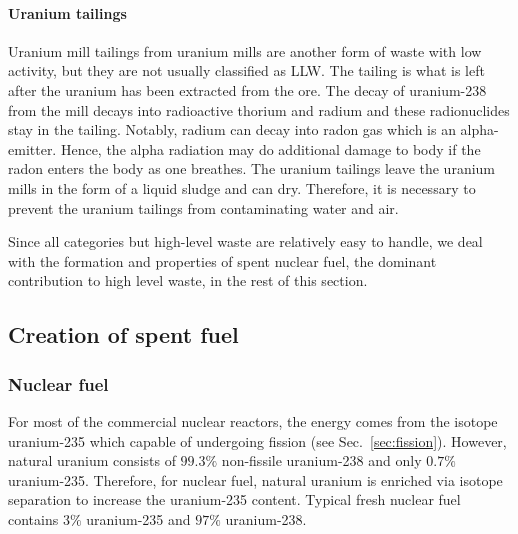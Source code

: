 \documentclass[nofootinbib,preprint,aps]{revtex4-1}
\begin{document}
    \paragraph{Uranium tailings}
    Uranium mill tailings from uranium mills are another form of waste with low activity, but
    they are not usually classified as LLW. The tailing is what is left after the uranium has been
    extracted from the ore. The decay of uranium-238 from the mill decays into
    radioactive thorium and radium and these radionuclides stay in the tailing. Notably, radium
    can decay into radon gas which is an alpha-emitter. Hence, the alpha radiation may do additional
    damage to body if the radon enters the body as one breathes.
    The uranium tailings leave the uranium mills in the form of a liquid sludge
    and can dry. Therefore, it is necessary to prevent the uranium tailings
    from contaminating water and air.
    
    Since all categories but high-level waste are relatively easy to handle, we deal with the formation and
    properties of spent nuclear fuel, the dominant contribution to high level waste, in the rest of this section.

    \subsection{Creation of spent fuel}
    \subsubsection{Nuclear fuel}
    For most of the commercial nuclear reactors, the energy comes from the isotope uranium-235 which
    capable of undergoing fission (see Sec.~\ref{sec:fission}). However, natural uranium consists of $99.3\%$
    non-fissile uranium-238 and only $0.7\%$ uranium-235. Therefore, for nuclear fuel, natural uranium is enriched
    via isotope separation to increase the uranium-235 content. Typical fresh nuclear fuel contains $3\%$ uranium-235
    and $97\%$ uranium-238.
\end{document}
